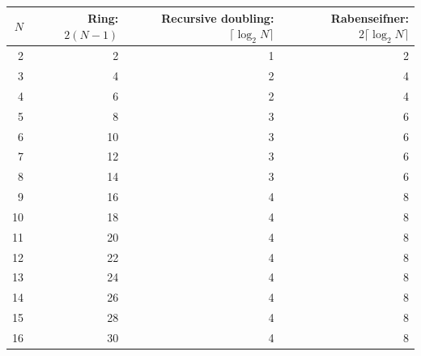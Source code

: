 \begin{tabular}{rrrr}
\toprule
$N$ & Ring: $2(N-1)$ & Recursive doubling: $\lceil\log_2 N\rceil$ & Rabenseifner: $2\lceil\log_2 N\rceil$ \\
\midrule
2 & 2 & 1 & 2 \\
3 & 4 & 2 & 4 \\
4 & 6 & 2 & 4 \\
5 & 8 & 3 & 6 \\
6 & 10 & 3 & 6 \\
7 & 12 & 3 & 6 \\
8 & 14 & 3 & 6 \\
9 & 16 & 4 & 8 \\
10 & 18 & 4 & 8 \\
11 & 20 & 4 & 8 \\
12 & 22 & 4 & 8 \\
13 & 24 & 4 & 8 \\
14 & 26 & 4 & 8 \\
15 & 28 & 4 & 8 \\
16 & 30 & 4 & 8 \\
\bottomrule
\end{tabular}
